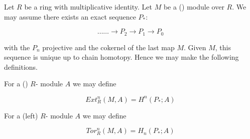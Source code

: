 \documentclass[12pt]{article}
\begin{document}
Let $R$ be a ring with multiplicative identity.  Let $M$ be a () module over $R$.  We may assume there exists an exact sequence $P_*$:

$$
\dots\dots\rightarrow P_2\rightarrow P_1\rightarrow P_0
$$

with the $P_n$ projective and the cokernel of the last map $M$.  Given $M$, this sequence is unique up to chain homotopy.  Hence we may make the following definitions.

For a () $R$- module $A$ we may define

$$
Ext_R^n(M,A)=H^n(P_*; A)
$$

For a (left) $R$- module $A$ we may define

$$
Tor_R^n(M,A)=H_n(P_*; A)
$$
\end{document}
